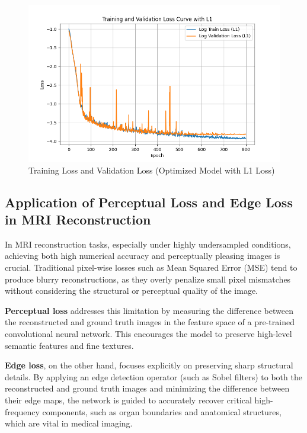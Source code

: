 \documentclass{article}
\begin{document}
\begin{figure}[H]
  \centering
  \includegraphics[width=\linewidth]{../assets/Training Loss and Validation Loss L1.png}
  \caption{Training Loss and Validation Loss (Optimized Model with L1 Loss)}
  \label{fig:loss_l1}
\end{figure}


\subsection{Application of Perceptual Loss and Edge Loss in MRI Reconstruction}

In MRI reconstruction tasks, especially under highly undersampled conditions, achieving both high numerical accuracy and perceptually pleasing images is crucial. Traditional pixel-wise losses such as Mean Squared Error (MSE) tend to produce blurry reconstructions, as they overly penalize small pixel mismatches without considering the structural or perceptual quality of the image.

\textbf{Perceptual loss} addresses this limitation by measuring the difference between the reconstructed and ground truth images in the feature space of a pre-trained convolutional neural network. This encourages the model to preserve high-level semantic features and fine textures.

\textbf{Edge loss}, on the other hand, focuses explicitly on preserving sharp structural details. By applying an edge detection operator (such as Sobel filters) to both the reconstructed and ground truth images and minimizing the difference between their edge maps, the network is guided to accurately recover critical high-frequency components, such as organ boundaries and anatomical structures, which are vital in medical imaging.
\end{document}
